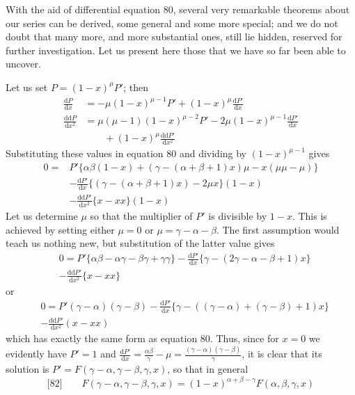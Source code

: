 With the aid of differential equation 80, several very remarkable theorems about our series can be derived, some general and some more special; and we do not doubt that many more, and more substantial ones, still lie hidden, reserved for further investigation. Let us present here those that we have so far been able to uncover.
\par{}
Let us set $P=(1-x)^\mu P'$; then
\[
\begin{aligned}
\frac{\mathrm{d}P}{\mathrm{d}x}&=-\mu(1-x)^{\mu-1}P'+(1-x)^\mu\frac{\mathrm{d}P'}{\mathrm{d}x}\\
\frac{\mathrm{dd}P}{\mathrm{d}x^2}&=\mu(\mu-1)(1-x)^{\mu-2}P'-2\mu(1-x)^{\mu-1}\frac{\mathrm{d}P'}{\mathrm{d}x}\\&\qquad+(1-x)^\mu\frac{\mathrm{dd}P'}{\mathrm{d}x^2}
\end{aligned}
\]
Substituting these values in equation 80 and dividing by $(1-x)^{\mu-1}$ gives
\[
\begin{aligned}
0={}&P'\{\alpha\beta(1-x)+(\gamma-(\alpha+\beta+1)x)\mu-x(\mu\mu-\mu)\}\\
&-\frac{\mathrm{d}P'}{\mathrm{d}x}\{(\gamma-(\alpha+\beta+1)x)-2\mu x\}(1-x)\\&-\frac{\mathrm{dd}P'}{\mathrm{d}x^2}\{x-xx\}(1-x)
\end{aligned}
\]
Let us determine $\mu$ so that the multiplier of $P'$ is divisible by $1-x$. This is achieved by setting either $\mu=0$ or $\mu=\gamma-\alpha-\beta$. The first assumption would teach us nothing new, but substitution of the latter value gives
\[
\begin{aligned}&0=P'\{\alpha\beta-\alpha\gamma-\beta\gamma+\gamma\gamma\}-\frac{\mathrm{d}P'}{\mathrm{d}x}\{\gamma-(2\gamma-\alpha-\beta+1)x\}\\&-\frac{\mathrm{dd}P'}{\mathrm{d}x^2}\{x-xx\}\end{aligned}
\]
or
\[
\begin{aligned}&0=P'(\gamma-\alpha)(\gamma-\beta)-\frac{\mathrm{d}P'}{\mathrm{d}x}\{\gamma-((\gamma-\alpha)+(\gamma-\beta)+1)x\}\\&-\frac{\mathrm{dd}P'}{\mathrm{d}x^2}(x-xx)\end{aligned}
\]
which has exactly the same form as equation 80. Thus, since for $x=0$ we evidently have $P'=1$ and $\frac{\mathrm{d}P'}{\mathrm{d}x}=\frac{\alpha\beta}{\gamma}-\mu=\frac{(\gamma-\alpha)(\gamma-\beta)}{\gamma}$, it is clear that its solution is $P'=F(\gamma-\alpha,\gamma-\beta,\gamma,x)$, so that in general
\[
\text{[82]}\qquad F(\gamma-\alpha,\gamma-\beta,\gamma,x)=(1-x)^{\alpha+\beta-\gamma}F(\alpha,\beta,\gamma,x)
\]
